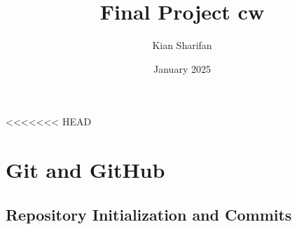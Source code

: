 \documentclass{article}
\title{Final Project cw}
\author{Kian Sharifan}
\date{January 2025}
\begin{document}
\maketitle
\newpage
\tableofcontents
\newpage

<<<<<<< HEAD
\section{Git and GitHub}
\subsection{Repository Initialization and Commits}
\end{document}
